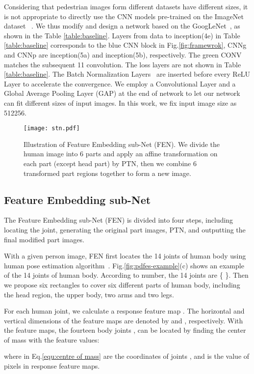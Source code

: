 \documentclass[10pt,twocolumn,letterpaper]{article}
\begin{document}
Considering that pedestrian images form different datasets have different sizes, it is not appropriate to directly use the CNN models pre-trained on the ImageNet dataset ~\cite{imagenet_cvpr09}. We thus modify and design a network based on the GoogLeNet~\cite{szegedy2015going}, as shown in the Table \ref{table:baseline}. Layers from data to inception(4e) in Table \ref{table:baseline} corresponds to the blue CNN block in Fig.\ref{fig:framewrok}, CNNg and CNNp are inception(5a) and inception(5b), respectively. The green CONV matches the subsequent 11 convolution. The loss layers are not shown in Table \ref{table:baseline}. The Batch Normalization Layers~\cite{ioffe2015batch} are inserted before every ReLU Layer to accelerate the convergence. We employ a Convolutional Layer and a Global Average Pooling Layer (GAP) at the end of network to let our network can fit different sizes of input images. In this work, we fix input image size as 512256.


\begin{figure}
\centering \texttt{[image: stn.pdf]}\\
\vspace{-1mm}
\caption{Illustration of Feature Embedding sub-Net (FEN). We divide the human image into 6 parts and apply an affine transformation on each part (except head part) by PTN, then we combine 6 transformed part regions together to form a new image.}
\vspace{-4mm}
\label{fig:PTN}\end{figure}

\subsection{Feature Embedding sub-Net }
The Feature Embedding sub-Net (FEN) is divided into four steps, including locating the joint, generating the original part images, PTN, and outputting the final modified part images.

With a given person image, FEN first locates the 14 joints of human body using human pose estimation algorithm~\cite{long2015fully}. Fig.\ref{fig:pdfes-example}(c) shows an example of the 14 joints of human body. According to number, the 14 joints are \{             \}. Then we propose six rectangles to cover six different parts of human body, including the head region, the upper body, two arms and two legs.


For each human joint, we calculate a response feature map . The horizontal and vertical dimensions of the feature maps are denoted by  and , respectively. With the feature maps, the fourteen body joints , can be located by finding the center of mass with the feature values:
\begin{center}

\end{center}
where  in Eq.\ref{equ:centre of mass} are the coordinates of joints , and  is the value of pixels in response feature maps.
\end{document}
